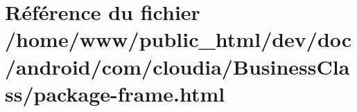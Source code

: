 \hypertarget{com_2cloudia_2_business_class_2package-frame_8html}{\section{Référence du fichier /home/www/public\-\_\-html/dev/doc/android/com/cloudia/\-Business\-Class/package-\/frame.html}
\label{com_2cloudia_2_business_class_2package-frame_8html}
}
